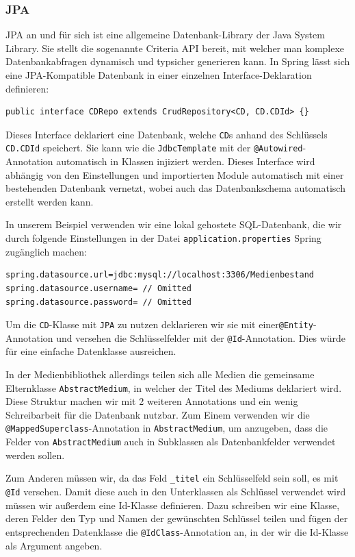 \documentclass{article}
\begin{document}
\subsubsection{JPA}

JPA an und für sich ist eine allgemeine Datenbank-Library der Java System Library.
Sie stellt die sogenannte Criteria API bereit, mit welcher man komplexe Datenbankabfragen dynamisch und typsicher generieren kann.
In Spring lässt sich eine JPA-Kompatible Datenbank in einer einzelnen Interface-Deklaration definieren:

\begin{lstlisting}
public interface CDRepo extends CrudRepository<CD, CD.CDId> {}
\end{lstlisting}

Dieses Interface deklariert eine Datenbank, welche \texttt{CD}s anhand des Schlüssels \texttt{CD.CDId} speichert.
Sie kann wie die \texttt{JdbcTemplate} mit der \texttt{@Autowired}-Annotation automatisch in Klassen injiziert werden.
Dieses Interface wird abhängig von den Einstellungen und importierten Module automatisch mit einer bestehenden Datenbank vernetzt, wobei auch das Datenbankschema automatisch erstellt werden kann.

In unserem Beispiel verwenden wir eine lokal gehostete SQL-Datenbank, die wir durch folgende Einstellungen in der Datei \texttt{application.properties} Spring zugänglich machen:

\begin{lstlisting}
spring.datasource.url=jdbc:mysql://localhost:3306/Medienbestand
spring.datasource.username= // Omitted
spring.datasource.password= // Omitted
\end{lstlisting}

Um die \texttt{CD}-Klasse mit \texttt{JPA} zu nutzen deklarieren wir sie mit einer\texttt{@Entity}-Annotation und versehen die Schlüsselfelder mit der \texttt{@Id}-Annotation.
Dies würde für eine einfache Datenklasse ausreichen.

In der Medienbibliothek allerdings teilen sich alle Medien die gemeinsame Elternklasse \texttt{AbstractMedium}, in welcher der Titel des Mediums deklariert wird.
Diese Struktur machen wir mit 2 weiteren Annotations und ein wenig Schreibarbeit für die Datenbank nutzbar.
Zum Einem verwenden wir die \texttt{@MappedSuperclass}-Annotation in \texttt{AbstractMedium}, um anzugeben, dass die Felder von \texttt{AbstractMedium} auch in Subklassen als Datenbankfelder verwendet werden sollen.

Zum Anderen müssen wir, da das Feld \texttt{\_titel} ein Schlüsselfeld sein soll, es mit \texttt{@Id} versehen.
Damit diese auch in den Unterklassen als Schlüssel verwendet wird müssen wir außerdem eine Id-Klasse definieren.
Dazu schreiben wir eine Klasse, deren Felder den Typ und Namen der gewünschten Schlüssel teilen und fügen der entsprechenden Datenklasse die \texttt{@IdClass}-Annotation an, in der wir die Id-Klasse als Argument angeben.
\end{document}
